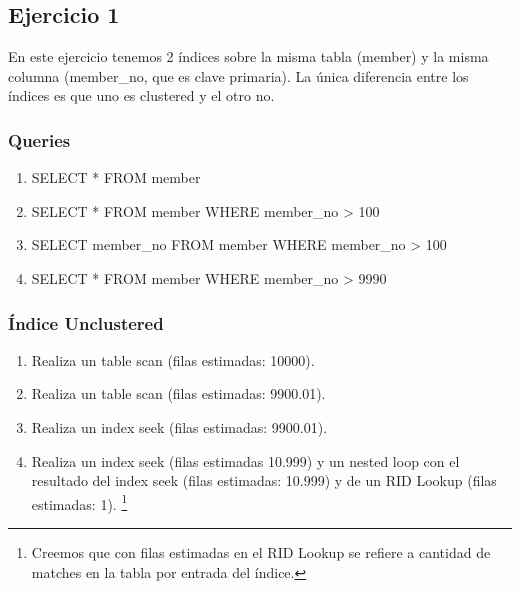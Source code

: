 \subsection{Ejercicio 1}

En este ejercicio tenemos 2 índices sobre la misma tabla (member) y la misma columna (member\_no, que es clave primaria).
La única diferencia entre los índices es que uno es clustered y el otro no.

\subsubsection{Queries}

\begin{enumerate}[label=(\alph*)]
\item SELECT * FROM member
\item SELECT * FROM member WHERE member\_no > 100
\item SELECT member\_no FROM member WHERE member\_no > 100
\item SELECT * FROM member WHERE member\_no > 9990
\end{enumerate}

\subsubsection{Índice Unclustered}
\begin{enumerate}[label=(\alph*)]
  \item Realiza un table scan (filas estimadas: 10000).
  \item Realiza un table scan (filas estimadas: 9900.01).
  \item Realiza un index seek (filas estimadas: 9900.01).
  \item Realiza un index seek (filas estimadas 10.999) y un nested loop con el resultado del index seek (filas estimadas: 10.999) y de un RID Lookup (filas estimadas: 1).
  \footnote{Creemos que con filas estimadas en el RID Lookup se refiere a cantidad de matches en la tabla por entrada del índice.}
\end{enumerate}


